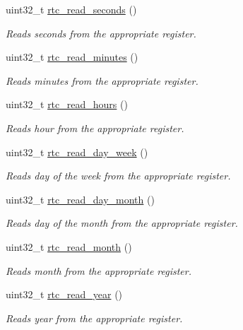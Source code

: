 \begin{DoxyCompactItemize}
uint32\+\_\+t \mbox{\hyperlink{group__rtc_ga3d9330b99a772073f924e69bc1b2df05}{rtc\+\_\+read\+\_\+seconds}} ()
\begin{DoxyCompactList}\small\item\em Reads seconds from the appropriate register. \end{DoxyCompactList}\item 
uint32\+\_\+t \mbox{\hyperlink{group__rtc_gaac43b2266aa06ad5a572d0fa3976ebb0}{rtc\+\_\+read\+\_\+minutes}} ()
\begin{DoxyCompactList}\small\item\em Reads minutes from the appropriate register. \end{DoxyCompactList}\item 
uint32\+\_\+t \mbox{\hyperlink{group__rtc_ga512adcbde067ca5bb83b1af0e0a7a444}{rtc\+\_\+read\+\_\+hours}} ()
\begin{DoxyCompactList}\small\item\em Reads hour from the appropriate register. \end{DoxyCompactList}\item 
uint32\+\_\+t \mbox{\hyperlink{group__rtc_ga2e585f34d69246a60a1db0e94ca09c05}{rtc\+\_\+read\+\_\+day\+\_\+week}} ()
\begin{DoxyCompactList}\small\item\em Reads day of the week from the appropriate register. \end{DoxyCompactList}\item 
uint32\+\_\+t \mbox{\hyperlink{group__rtc_ga59359f9460af7b7dce7a2c8dc9d98211}{rtc\+\_\+read\+\_\+day\+\_\+month}} ()
\begin{DoxyCompactList}\small\item\em Reads day of the month from the appropriate register. \end{DoxyCompactList}\item 
uint32\+\_\+t \mbox{\hyperlink{group__rtc_gabd90445bf474121fa89636a17f4c7369}{rtc\+\_\+read\+\_\+month}} ()
\begin{DoxyCompactList}\small\item\em Reads month from the appropriate register. \end{DoxyCompactList}\item 
uint32\+\_\+t \mbox{\hyperlink{group__rtc_ga4ddd82a19df760d95b2dd0c92ec6c63b}{rtc\+\_\+read\+\_\+year}} ()
\begin{DoxyCompactList}\small\item\em Reads year from the appropriate register. \end{DoxyCompactList}\item 

\end{DoxyCompactItemize}
